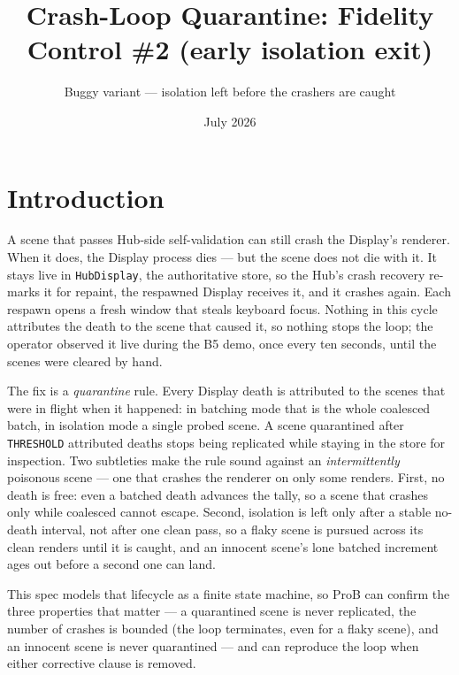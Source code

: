 \documentclass[a4paper,10pt,fleqn]{article}
\begin{document}
\title{Crash-Loop Quarantine: Fidelity Control \#2 (early isolation exit)}
\author{Buggy variant --- isolation left before the crashers are caught}
\date{July 2026}
\maketitle

\section{Introduction}

A scene that passes Hub-side self-validation can still crash the Display's
renderer.  When it does, the Display process dies --- but the scene does not
die with it.  It stays live in \texttt{HubDisplay}, the authoritative store, so
the Hub's crash recovery re-marks it for repaint, the respawned Display receives
it, and it crashes again.  Each respawn opens a fresh window that steals
keyboard focus.  Nothing in this cycle attributes the death to the scene that
caused it, so nothing stops the loop; the operator observed it live during the
B5 demo, once every ten seconds, until the scenes were cleared by hand.

The fix is a \emph{quarantine} rule.  Every Display death is attributed to the
scenes that were in flight when it happened: in batching mode that is the whole
coalesced batch, in isolation mode a single probed scene.  A scene quarantined
after \texttt{THRESHOLD} attributed deaths stops being replicated while staying
in the store for inspection.  Two subtleties make the rule sound against an
\emph{intermittently} poisonous scene --- one that crashes the renderer on only
some renders.  First, no death is free: even a batched death advances the tally,
so a scene that crashes only while coalesced cannot escape.  Second, isolation is
left only after a stable no-death interval, not after one clean pass, so a flaky
scene is pursued across its clean renders until it is caught, and an innocent
scene's lone batched increment ages out before a second one can land.

This spec models that lifecycle as a finite state machine, so ProB can confirm
the three properties that matter --- a quarantined scene is never replicated, the
number of crashes is bounded (the loop terminates, even for a flaky scene), and
an innocent scene is never quarantined --- and can reproduce the loop when either
corrective clause is removed.
\end{document}
